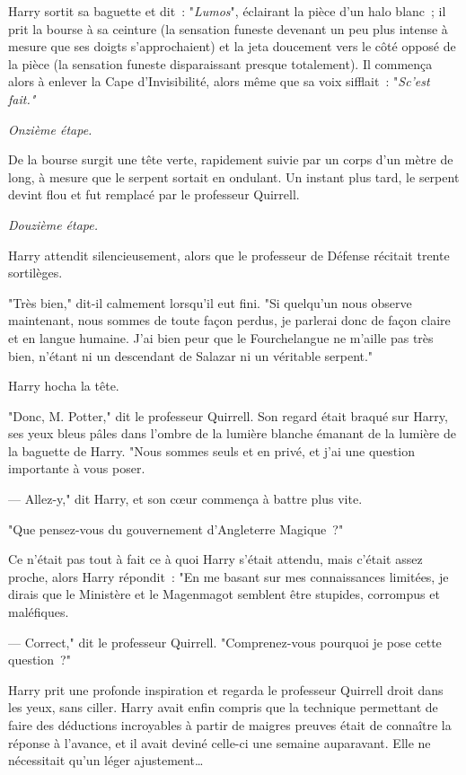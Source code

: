 Harry sortit sa baguette et dit~: "\emph{Lumos}", éclairant la pièce d'un halo blanc~; il prit la bourse à sa ceinture (la sensation funeste devenant un peu plus intense à mesure que ses doigts s'approchaient) et la jeta doucement vers le côté opposé de la pièce (la sensation funeste disparaissant presque totalement). Il commença alors à enlever la Cape d'Invisibilité, alors même que sa voix sifflait~: "\emph{Sc'est fait."}

\emph{Onzième étape.}

De la bourse surgit une tête verte, rapidement suivie par un corps d'un mètre de long, à mesure que le serpent sortait en ondulant. Un instant plus tard, le serpent devint flou et fut remplacé par le professeur Quirrell.

\emph{Douzième étape.}

Harry attendit silencieusement, alors que le professeur de Défense récitait trente sortilèges.

"Très bien," dit-il calmement lorsqu'il eut fini. "Si quelqu'un nous observe maintenant, nous sommes de toute façon perdus, je parlerai donc de façon claire et en langue humaine. J'ai bien peur que le Fourchelangue ne m'aille pas très bien, n'étant ni un descendant de Salazar ni un véritable serpent."

Harry hocha la tête.

"Donc, M. Potter," dit le professeur Quirrell. Son regard était braqué sur Harry, ses yeux bleus pâles dans l'ombre de la lumière blanche émanant de la lumière de la baguette de Harry. "Nous sommes seuls et en privé, et j'ai une question importante à vous poser.

--- Allez-y," dit Harry, et son cœur commença à battre plus vite.

"Que pensez-vous du gouvernement d'Angleterre Magique~?"

Ce n'était pas tout à fait ce à quoi Harry s'était attendu, mais c'était assez proche, alors Harry répondit~: "En me basant sur mes connaissances limitées, je dirais que le Ministère et le Magenmagot semblent être stupides, corrompus et maléfiques.

--- Correct," dit le professeur Quirrell. "Comprenez-vous pourquoi je pose cette question~?"

Harry prit une profonde inspiration et regarda le professeur Quirrell droit dans les yeux, sans ciller. Harry avait enfin compris que la technique permettant de faire des déductions incroyables à partir de maigres preuves était de connaître la réponse à l'avance, et il avait deviné celle-ci une semaine auparavant. Elle ne nécessitait qu'un léger ajustement…

